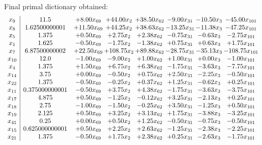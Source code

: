 \documentclass[8pt]{article}
\begin{document}
 Final primal dictionary obtained: 
\[\begin{array}{c| c c@{\hskip 2pt} c@{\hskip 2pt} c@{\hskip 2pt} c@{\hskip 2pt} c@{\hskip 2pt} c@{\hskip 2pt} }
 x_{9}   &  11.5 & +  8.00 x_{69} & + 44.00 x_{2} & + 38.50 x_{62} & -9.00 x_{31} & -10.50 x_{3} & -45.00 x_{101}\\
 x_{8}   &  1.62500000001 & + 11.50 x_{69} & + 44.25 x_{2} & + 38.63 x_{62} & -13.25 x_{31} & -11.38 x_{3} & -47.25 x_{101}\\
 x_{5}   &  1.375 & +  0.50 x_{69} & +  2.75 x_{2} & +  2.38 x_{62} & -0.75 x_{31} & -0.63 x_{3} & -2.75 x_{101}\\
 x_{1}   &  1.625 & -0.50 x_{69} & -1.75 x_{2} & -1.38 x_{62} & +  0.75 x_{31} & +  0.63 x_{3} & +  1.75 x_{101}\\
 x_{7}   &  6.87500000002 & + 22.50 x_{69} & + 108.75 x_{2} & + 89.88 x_{62} & -28.75 x_{31} & -35.13 x_{3} & -108.75 x_{101}\\
 x_{10}   &  12.0 & -1.00 x_{69} & -9.00 x_{2} & +  1.00 x_{62} & +  1.00 x_{31} & +  0.00 x_{3} & -1.00 x_{101}\\
 x_{4}   &  1.375 & +  1.50 x_{69} & +  6.75 x_{2} & +  6.38 x_{62} & -1.75 x_{31} & -3.63 x_{3} & -7.75 x_{101}\\
 x_{14}   &  3.75 & +  0.00 x_{69} & -0.50 x_{2} & +  0.75 x_{62} & +  2.50 x_{31} & -2.25 x_{3} & -0.50 x_{101}\\
 x_{22}   &  1.375 & -0.50 x_{69} & -0.25 x_{2} & +  0.37 x_{62} & +  1.25 x_{31} & -0.62 x_{3} & +  0.25 x_{101}\\
 x_{11}   &  0.375000000001 & -0.50 x_{69} & +  3.75 x_{2} & +  4.38 x_{62} & -1.75 x_{31} & -3.63 x_{3} & -3.75 x_{101}\\
 x_{17}   &  4.875 & +  0.50 x_{69} & -1.25 x_{2} & -0.12 x_{62} & +  3.25 x_{31} & -2.13 x_{3} & +  0.25 x_{101}\\
 x_{18}   &  2.75 & -1.00 x_{69} & -1.50 x_{2} & -0.25 x_{62} & +  3.50 x_{31} & -1.25 x_{3} & +  0.50 x_{101}\\
 x_{19}   &  2.125 & +  0.50 x_{69} & +  3.25 x_{2} & +  3.13 x_{62} & +  1.75 x_{31} & -3.88 x_{3} & -3.25 x_{101}\\
 x_{41}   &  0.25 & +  0.00 x_{69} & +  0.50 x_{2} & +  1.25 x_{62} & -0.50 x_{31} & -0.75 x_{3} & -0.50 x_{101}\\
 x_{15}   &  0.625000000001 & +  0.50 x_{69} & +  2.25 x_{2} & +  2.63 x_{62} & -1.25 x_{31} & -2.38 x_{3} & -2.25 x_{101}\\
 x_{21}   &  1.375 & -0.50 x_{69} & +  1.75 x_{2} & +  2.38 x_{62} & +  0.25 x_{31} & -2.63 x_{3} & -1.75 x_{101}\\

\end{array}\]
\end{document}
